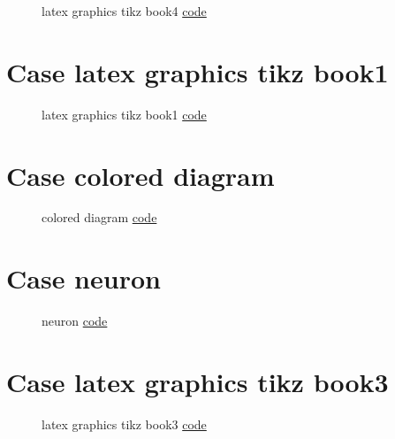 \documentclass{article}
\begin{document}
\begin{figure}[H]
    \centering
    
    \caption{latex graphics tikz book4 \href{https:/github.com/cauliyang/learn_tikz/blob/main/source/source/latex_graphics_tikz_book4.tex}{code} }
    \label{fig:latex graphics tikz book4}
\end{figure}

\section{Case latex graphics tikz book1}

\begin{figure}[H]
    \centering
    
    \caption{latex graphics tikz book1 \href{https:/github.com/cauliyang/learn_tikz/blob/main/source/source/latex_graphics_tikz_book1.tex}{code} }
    \label{fig:latex graphics tikz book1}
\end{figure}

\section{Case colored diagram}

\begin{figure}[H]
    \centering
    
    \caption{colored diagram \href{https:/github.com/cauliyang/learn_tikz/blob/main/source/source/colored_diagram.tex}{code} }
    \label{fig:colored diagram}
\end{figure}

\section{Case neuron}

\begin{figure}[H]
    \centering
    
    \caption{neuron \href{https:/github.com/cauliyang/learn_tikz/blob/main/source/source/neuron.tex}{code} }
    \label{fig:neuron}
\end{figure}

\section{Case latex graphics tikz book3}

\begin{figure}[H]
    \centering
    
    \caption{latex graphics tikz book3 \href{https:/github.com/cauliyang/learn_tikz/blob/main/source/source/latex_graphics_tikz_book3.tex}{code} }
    \label{fig:latex graphics tikz book3}
\end{figure}
\end{document}
